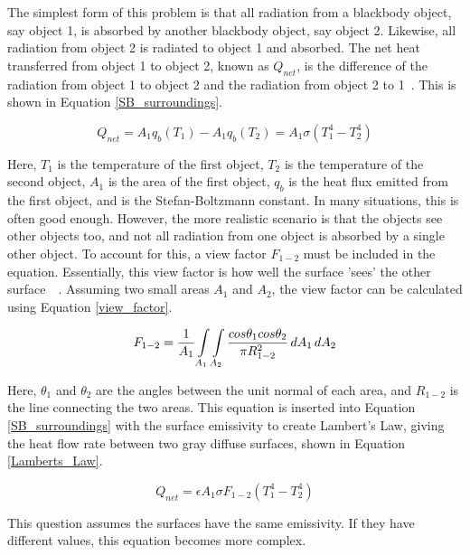 The simplest form of this problem is that all radiation from a blackbody object, say object 1, is absorbed by another blackbody object, say object 2. Likewise, all radiation from object 2 is radiated to object 1 and absorbed. The net heat transferred from object 1 to object 2, known as $Q_{net}$, is the difference of the radiation from object 1 to object 2 and the radiation from object 2 to 1~\citep{heat_transfer_textbook}. This is shown in Equation \ref{SB_surroundings}.

\begin{equation}\label{SB_surroundings}
    Q_{net} = A_1 q_b (T_1) - A_1 q_b (T_2) = A_1 \sigma (T_1^4 - T_2^4)
\end{equation}

Here, $T_1$ is the temperature of the first object, $T_2$ is the temperature of the second object, $A_1$ is the area of the first object, $q_b$ is the heat flux emitted from the first object, and {\textsigma} is the Stefan-Boltzmann constant. In many situations, this is often good enough. However, the more realistic scenario is that the objects see other objects too, and not all radiation from one object is absorbed by a single other object. To account for this, a view factor $F_{1-2}$ must be included in the equation. Essentially, this view factor is how well the surface 'sees' the other surface~\citep{heat_transfer_textbook}~\citep{FEA_SW}. Assuming two small areas $A_1$ and $A_2$, the view factor can be calculated using Equation \ref{view_factor}.

\begin{equation}\label{view_factor}
    F_{1-2} = \frac{1}{A_1} \int\limits_{A_1} \int\limits_{A_2} \frac{cos \theta_1 cos \theta_2}{\pi R_{1-2}^2} \,dA_1\,dA_2
\end{equation}

Here, $\theta_1$ and $\theta_2$ are the angles between the unit normal of each area, and $R_{1-2}$ is the line connecting the two areas. This equation is inserted into Equation \ref{SB_surroundings} with the surface emissivity to create Lambert's Law, giving the heat flow rate between two gray diffuse surfaces, shown in Equation \ref{Lamberts_Law}.

\begin{equation}\label{Lamberts_Law}
    Q_{net} = \epsilon A_1 \sigma F_{1-2} (T_1^4 - T_2^4)
\end{equation}

This question assumes the surfaces have the same emissivity. If they have different values, this equation becomes more complex.

